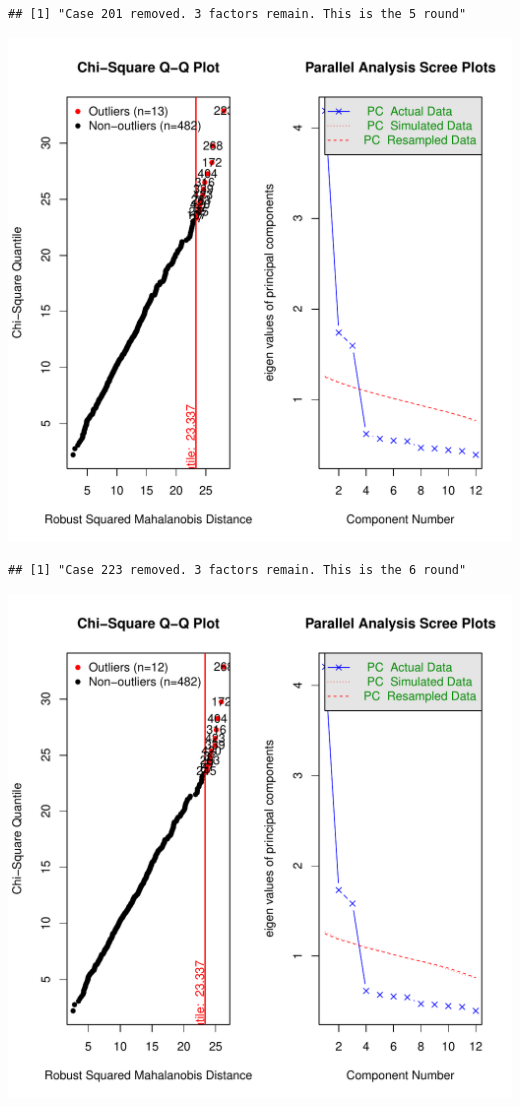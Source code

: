 \documentclass{article}\usepackage[]{graphicx}\usepackage[]{color}
\makeatletter
\def\maxwidth{ %
  \ifdim\Gin@nat@width>\linewidth
    \linewidth
  \else
    \Gin@nat@width
  \fi
}
\newenvironment{kframe}{%
 \def\at@end@of@kframe{}%
 \ifinner\ifhmode%
  \def\at@end@of@kframe{\end{minipage}}%
  \begin{minipage}{\columnwidth}%
 \fi\fi%
 \def\FrameCommand##1{\hskip\@totalleftmargin \hskip-\fboxsep
 \colorbox{shadecolor}{##1}\hskip-\fboxsep
     \hskip-\linewidth \hskip-\@totalleftmargin \hskip\columnwidth}%
 \MakeFramed {\advance\hsize-\width
   \@totalleftmargin\z@ \linewidth\hsize
   \@setminipage}}%
 {\par\unskip\endMakeFramed%
 \at@end@of@kframe}
\newenvironment{knitrout}{}{} %
\makeatother
\begin{document}
\begin{knitrout}
\begin{kframe}\begin{verbatim}
## [1] "Case 201 removed. 3 factors remain. This is the 5 round"
\end{verbatim}
\end{kframe}
\includegraphics[width=\maxwidth]{figure/unnamed-chunk-10-6} 
\begin{kframe}\begin{verbatim}
## [1] "Case 223 removed. 3 factors remain. This is the 6 round"
\end{verbatim}
\end{kframe}
\includegraphics[width=\maxwidth]{figure/unnamed-chunk-10-7} 

\end{knitrout}
\end{document}
